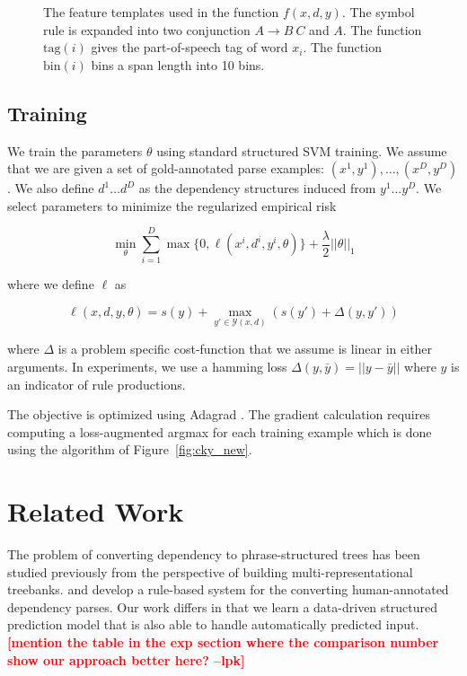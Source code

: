 \documentclass[11pt,letterpaper]{article}
\newcommand{\RuleSym}{\mathrm{rule}}
\newcommand{\Rule}[3]{#1 \rightarrow #2\ #3}
\newcommand{\BinFN}[1]{\mathrm{bin}({#1})}
\newcommand{\TagFN}[1]{\mathrm{tag}({#1})}
\newcommand{\lpkcomment}[1]{\textcolor{red}{\bf \small [#1 --lpk]}}
\begin{document}
\begin{figure}
\begin{multicols}{2}
\begin{tabular}{|l|l}
  \hline

  \end{tabular}
  \end{multicols}
  \label{fig:features}
  \caption{The feature templates used in the function $f(x, d, y)$. The symbol $\RuleSym$ is expanded into two conjunction $\Rule{A}{B}{C}$ and $A$. The function $\TagFN{i}$ gives the part-of-speech tag of word $x_i$. The function $\BinFN{i}$ bins a span length into 10 bins.
  }
\end{figure}

\subsection{Training}

We train the parameters $\theta$ using standard structured SVM training.
We assume that we are given a set of gold-annotated parse examples: $( x^{1}, y^{1}), \ldots,  (x^{D}, y^{D})$. We also define $d^{1} \ldots d^{D}$ as the dependency structures induced from $y^{1} \ldots y^{D}$.
We select parameters to minimize the regularized empirical risk

\[ \min_{\theta} \sum_{i = 1}^D \max\{0,  \ell( x^{i}, d^{i} , y^{i}, \theta) \} + \frac{\lambda}{2} ||\theta||_1 \]

\noindent where we define $\ell$ as

\[\ell(x, d, y, \theta) = s(y) + \max_{y' \in \mathcal{Y}(x, d)}\left(s(y')  + \Delta(y, y') \right) \]


\noindent where $\Delta$ is a problem specific cost-function that we assume is linear in either arguments.
In experiments, we use a hamming loss  $\Delta(y, \bar{y}) = || y - \bar{y}||$ where $y$ is an indicator
of rule productions.

The objective is optimized using Adagrad \cite{}.  The gradient
calculation requires computing a loss-augmented argmax for each
training example which is done using the algorithm of Figure~\ref{fig:cky_new}.


\section{Related Work}

The problem of converting dependency to phrase-structured trees has
been studied previously from the perspective of building
multi-representational treebanks.   and
 develop a rule-based system for the
converting human-annotated dependency parses. Our work differs in that
we learn a data-driven structured prediction model that is also able
to handle automatically predicted input.\lpkcomment{mention the table in the exp section where the comparison number show our approach better here?}
\end{document}

